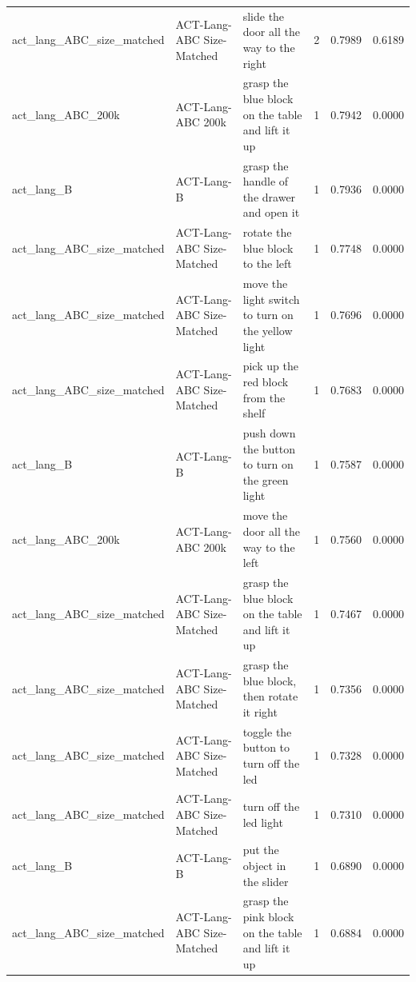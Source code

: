 \begin{tabular}{lllrrr}
act\_lang\_ABC\_size\_matched & ACT-Lang-ABC Size-Matched & slide the door all the way to the right & 2 & 0.7989 & 0.6189 \\
act\_lang\_ABC\_200k & ACT-Lang-ABC 200k & grasp the blue block on the table and lift it up & 1 & 0.7942 & 0.0000 \\
act\_lang\_B & ACT-Lang-B & grasp the handle of the drawer and open it & 1 & 0.7936 & 0.0000 \\
act\_lang\_ABC\_size\_matched & ACT-Lang-ABC Size-Matched & rotate the blue block to the left & 1 & 0.7748 & 0.0000 \\
act\_lang\_ABC\_size\_matched & ACT-Lang-ABC Size-Matched & move the light switch to turn on the yellow light & 1 & 0.7696 & 0.0000 \\
act\_lang\_ABC\_size\_matched & ACT-Lang-ABC Size-Matched & pick up the red block from the shelf & 1 & 0.7683 & 0.0000 \\
act\_lang\_B & ACT-Lang-B & push down the button to turn on the green light & 1 & 0.7587 & 0.0000 \\
act\_lang\_ABC\_200k & ACT-Lang-ABC 200k & move the door all the way to the left & 1 & 0.7560 & 0.0000 \\
act\_lang\_ABC\_size\_matched & ACT-Lang-ABC Size-Matched & grasp the blue block on the table and lift it up & 1 & 0.7467 & 0.0000 \\
act\_lang\_ABC\_size\_matched & ACT-Lang-ABC Size-Matched & grasp the blue block, then rotate it right & 1 & 0.7356 & 0.0000 \\
act\_lang\_ABC\_size\_matched & ACT-Lang-ABC Size-Matched & toggle the button to turn off the led & 1 & 0.7328 & 0.0000 \\
act\_lang\_ABC\_size\_matched & ACT-Lang-ABC Size-Matched & turn off the led light & 1 & 0.7310 & 0.0000 \\
act\_lang\_B & ACT-Lang-B & put the object in the slider & 1 & 0.6890 & 0.0000 \\
act\_lang\_ABC\_size\_matched & ACT-Lang-ABC Size-Matched & grasp the pink block on the table and lift it up & 1 & 0.6884 & 0.0000 \\
\bottomrule
\end{tabular}
